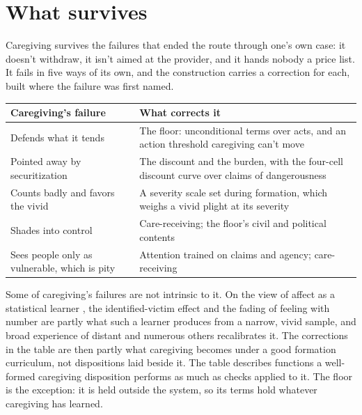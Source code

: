 \section{What survives}
\label{sec:21.8}
Caregiving survives the failures that ended the route through one's own case: it doesn't withdraw, it isn't aimed at the provider, and it hands nobody a price list. It fails in five ways of its own, and the construction carries a correction for each, built where the failure was first named.

\begingroup\small\renewcommand{\arraystretch}{1.12}
\begin{longtable}{@{}>{\raggedright\arraybackslash}p{}>{\raggedright\arraybackslash}p{}@{}}
\hline
\textbf{Caregiving's failure} & \textbf{What corrects it} \\
\hline
\endhead
Defends what it tends & The floor: unconditional terms over acts, and an action threshold caregiving can't move \\ \hline
Pointed away by securitization & The discount and the burden, with the four-cell discount curve over claims of dangerousness \\ \hline
Counts badly and favors the vivid & A severity scale set during formation, which weighs a vivid plight at its severity \\ \hline
Shades into control & Care-receiving; the floor's civil and political contents \\ \hline
Sees people only as vulnerable, which is pity & Attention trained on claims and agency; care-receiving \\ \hline
\end{longtable}
\endgroup

Some of caregiving's failures are not intrinsic to it. On the view of affect as a statistical learner \autocite{railton2014affective}, the identified-victim effect and the fading of feeling with number are partly what such a learner produces from a narrow, vivid sample, and broad experience of distant and numerous others recalibrates it. The corrections in the table are then partly what caregiving becomes under a good formation curriculum, not dispositions laid beside it. The table describes functions a well-formed caregiving disposition performs as much as checks applied to it. The floor is the exception: it is held outside the system, so its terms hold whatever caregiving has learned.

